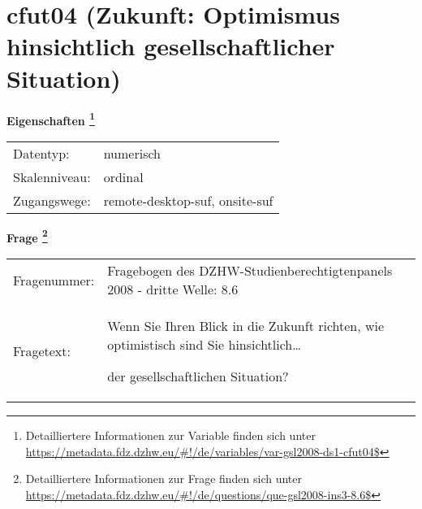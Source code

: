
    \setcounter{footnote}{0}

    \vspace*{-1.8cm}
	\section{cfut04 (Zukunft: Optimismus hinsichtlich gesellschaftlicher Situation)}
	\label{section:cfut04}



    \vspace*{0.5cm}
    \noindent\textbf{Eigenschaften
	\footnote{Detailliertere Informationen zur Variable finden sich unter
		\url{https://metadata.fdz.dzhw.eu/\#!/de/variables/var-gsl2008-ds1-cfut04$}}}\\
	\begin{tabularx}{\hsize}{@{}lX}
	Datentyp: & numerisch \\
	Skalenniveau: & ordinal \\
	Zugangswege: &
	  remote-desktop-suf, 
	  onsite-suf
 \\
    \end{tabularx}



				\vspace*{0.5cm}
                \noindent\textbf{Frage
	                \footnote{Detailliertere Informationen zur Frage finden sich unter
		              \url{https://metadata.fdz.dzhw.eu/\#!/de/questions/que-gsl2008-ins3-8.6$}}}\\
				\begin{tabularx}{\hsize}{@{}lX}
					Fragenummer: &
					  Fragebogen des DZHW-Studienberechtigtenpanels 2008 - dritte Welle:
					  8.6
 \\
					Fragetext: & Wenn Sie Ihren Blick in die Zukunft richten, wie optimistisch sind Sie hinsichtlich…\par  der gesellschaftlichen Situation? \\
				\end{tabularx}





